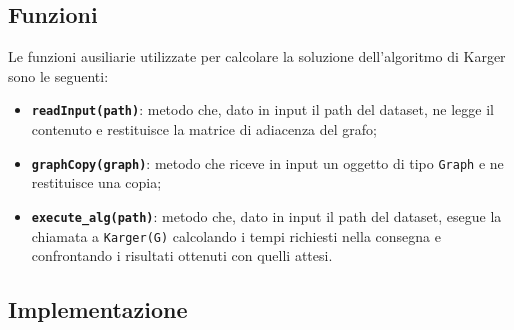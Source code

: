 \subsection{Funzioni}
	
	Le funzioni ausiliarie utilizzate per calcolare la soluzione dell'algoritmo di Karger sono le seguenti:
	\begin{itemize}
		\item \texttt{\textbf{readInput(path)}}: metodo che, dato in input il path del dataset, ne legge il contenuto e restituisce la matrice di adiacenza del grafo;
		\item \texttt{\textbf{graphCopy(graph)}}: metodo che riceve in input un oggetto di tipo \texttt{Graph} e ne restituisce una copia;
		\item \texttt{\textbf{execute\_alg(path)}}: metodo che, dato in input il path del dataset, esegue la chiamata a \texttt{Karger(G)} calcolando i tempi richiesti nella consegna e confrontando i risultati ottenuti con quelli attesi.
	\end{itemize}

\subsection{Implementazione}
	
